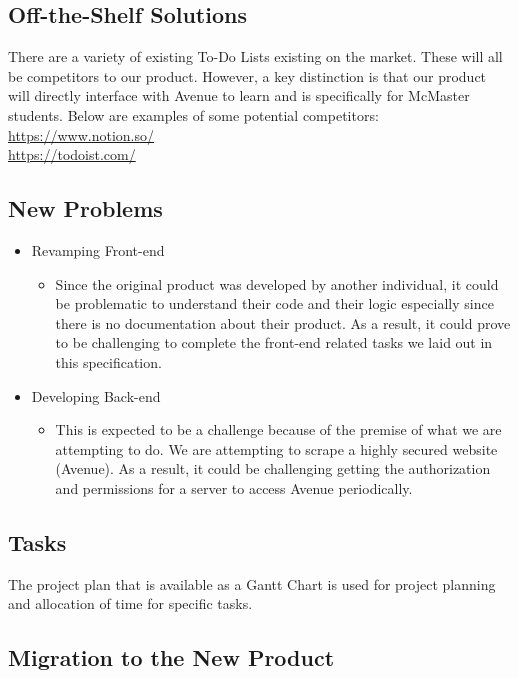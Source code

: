 \documentclass[12pt, titlepage]{article}
\begin{document}
\subsection{Off-the-Shelf Solutions}

There are a variety of existing To-Do Lists existing on the market. These will all be competitors to our product. However, a key distinction is that our product will directly interface with Avenue to learn and is specifically for McMaster students. Below are examples of some potential competitors:\\
\url{https://www.notion.so/}\\
\url{https://todoist.com/}

\subsection{New Problems}

\begin{itemize}
\item Revamping Front-end
\begin{itemize}
	\item Since the original product was developed by another individual, it could be problematic to understand their code and their logic especially since there is no documentation about their product. As a result, it could prove to be challenging to complete the front-end related tasks we laid out in this specification.
	\end{itemize}
\item Developing Back-end
\begin{itemize}
	\item This is expected to be a challenge because of the premise of what we are attempting to do. We are attempting to scrape a highly secured website (Avenue). As a result, it could be challenging getting the authorization and permissions for a server to access Avenue periodically.
	\end{itemize}
\end{itemize}

\subsection{Tasks}

The project plan that is available as a Gantt Chart is used for project planning and allocation of time for specific tasks.

\subsection{Migration to the New Product}
\end{document}
